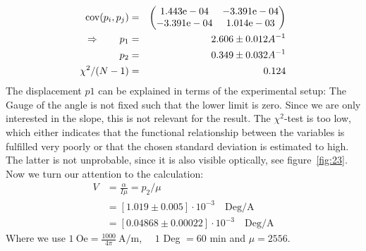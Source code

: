 \begin{eqnarray}
    \mathrm{cov}(p_i, p_j) &=& 
    \begin{pmatrix}
        1.443\mathrm{e}-04 &-3.391\mathrm{e}-04 \\
        -3.391\mathrm{e}-04 &1.014\mathrm{e}-03 \\
    \end{pmatrix}
\\ \Rightarrow \qquad
    p_1 &=& 2.606 \pm 0.012 A^{-1}\\
    p_2 &=& 0.349 \pm 0.032 A^{-1} \\
    \chi ^2/(N-1) &=&  0.124
\end{eqnarray}
The displacement $p1$ can be explained in terms of the experimental setup: The Gauge of the 
angle is not fixed such that the lower limit is zero. Since we are only interested in the slope,
this is not relevant for the result. The $\chi^2$-test is too low, which either indicates that
the functional relationship between the variables is fulfilled very poorly or that the chosen
standard deviation is estimated to high. The latter is not unprobable, since it is also
visible optically, see figure~\ref{fig:23}. Now we turn our attention to the calculation:
\begin{align}
    V &= \frac{\alpha}{I\mu}   = p_2 / \mu \\
      &= \left [ 1.019 \pm 0.005 \right ]\cdot 10^{-3} \quad \mathrm{Deg/A} \\
      &= \left [ 0.04868 \pm 0.00022 \right ] \cdot 10^{-3} \quad \mathrm{Deg/A}
\end{align}
Where we use $1\ \mathrm{Oe} = \frac{1000}{4\pi}\ \mathrm{A/m}$, $\quad1$ Deg $=60$ min \quad and $\mu = 2556$.




